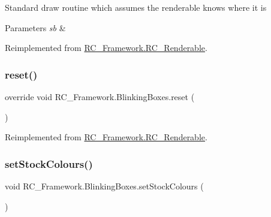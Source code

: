 Standard draw routine which assumes the renderable knows where it is 


\begin{DoxyParams}{Parameters}
{\em sb} & \\
\hline
\end{DoxyParams}


Reimplemented from \mbox{\hyperlink{class_r_c___framework_1_1_r_c___renderable_acc26db34e382a25a989c4c0dd0354b23}{R\+C\+\_\+\+Framework.\+R\+C\+\_\+\+Renderable}}.

\mbox{\label{class_r_c___framework_1_1_blinking_boxes_a2120dce99476eb2e086063a004acfd90}} 
\subsubsection{\texorpdfstring{reset()}{reset()}}
{\footnotesize\ttfamily override void R\+C\+\_\+\+Framework.\+Blinking\+Boxes.\+reset (\begin{DoxyParamCaption}{ }\end{DoxyParamCaption})\hspace{0.3cm}{\ttfamily [virtual]}}



Reimplemented from \mbox{\hyperlink{class_r_c___framework_1_1_r_c___renderable_ae65ce69704d15963789f421b58618b1f}{R\+C\+\_\+\+Framework.\+R\+C\+\_\+\+Renderable}}.

\mbox{\label{class_r_c___framework_1_1_blinking_boxes_a1037bf0c922befbecbdca455d7f6165b}} 
\subsubsection{\texorpdfstring{set\+Stock\+Colours()}{setStockColours()}}
{\footnotesize\ttfamily void R\+C\+\_\+\+Framework.\+Blinking\+Boxes.\+set\+Stock\+Colours (\begin{DoxyParamCaption}{ }\end{DoxyParamCaption})}

